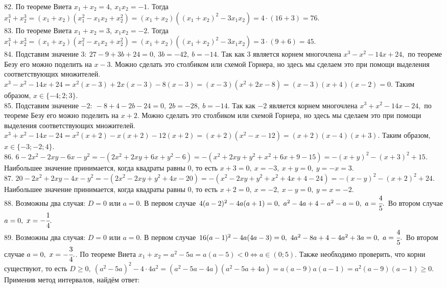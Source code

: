 \documentclass[12pt]{article}
\begin{document}
82. По теореме Виета $x_1+x_2=4,\ x_1x_2=-1.$ Тогда $x_1^3+x_2^3=(x_1+x_2)(x_1^2-x_1x_2+x_2^2)=(x_1+x_2)((x_1+x_2)^2-3x_1x_2)=4\cdot(16+3)=76.$\\
83. По теореме Виета $x_1+x_2=3,\ x_1x_2=-2.$ Тогда $x_1^3+x_2^3=(x_1+x_2)(x_1^2-x_1x_2+x_2^2)=(x_1+x_2)((x_1+x_2)^2-3x_1x_2)=3\cdot(9+6)=45.$\\
84. Подставим значение $3:\ 27-9+3b+24=0,\ 3b=-42,\ b=-14.$ Так как 3 является корнем многочлена $x^3-x^2-14x+24,$ по теореме Безу его можно поделить на $x-3.$ Можно сделать это столбиком или схемой Горнера, но здесь мы сделаем это при помощи выделения соответствующих множителей.
$x^3-x^2-14x+24=x^2(x-3)+2x(x-3)-8(x-3)=(x-3)(x^2+2x-8)=(x-3)(x+4)(x-2)=0.$ Таким образом, $x\in\{-4; 2; 3\}.$\\
85. Подставим значение $-2:\ -8+4-2b-24=0,\ 2b=-28,\ b=-14.$ Так как $-2$ является корнем многочлена $x^3+x^2-14x-24,$ по теореме Безу его можно поделить на $x+2.$ Можно сделать это столбиком или схемой Горнера, но здесь мы сделаем это при помощи выделения соответствующих множителей.
$x^3+x^2-14x-24=x^2(x+2)-x(x+2)-12(x+2)=(x+2)(x^2-x-12)=(x+2)(x-4)(x+3).$ Таким образом, $x\in\{-3; -2; 4\}.$\\
86. $6-2x^2-2xy-6x-y^2=-(2x^2+2xy+6x+y^2-6)=-(x^2+2xy+y^2+x^2+6x+9-15)=-(x+y)^2-(x+3)^2+15.$ Наибольшее значение принимается, когда квадраты равны 0, то есть $x+3=0,\ x=-3,\ x+y=0,\ y=-x=3.$\\
87. $20-2x^2+2xy-4x-y^2=-(2x^2-2xy+y^2+4x-20)=-(x^2-2xy+y^2+x^2+4x+4-24)=-(x-y)^2-(x+2)^2+24.$ Наибольшее значение принимается, когда квадраты равны 0, то есть $x+2=0,\ x=-2,\ x-y=0,\ y=x=-2.$\\
88. Возможны два случая: $D=0$ или $a=0.$ В первом случае $4(a-2)^2-4a(a+1)=0,\ a^2-4a+4-a^2-a=0,\ a=\cfrac{4}{5}.$ Во втором случае $a=0,\ x=-\cfrac{1}{4}.$\\
89. Возможны два случая: $D=0$ или $a=0.$ В первом случае $16(a-1)^2-4a(4a-3)=0,\ 4a^2-8a+4-4a^2+3a=0,\ a=\cfrac{4}{5}.$ Во втором случае $a=0,\ x=-\cfrac{3}{4}.$\newpage{}. По теореме Виета $x_1+x_2=a^2-5a=a(a-5)<0\Leftrightarrow a\in(0;5).$ Также необходимо проверить, что корни существуют, то есть $D\geqslant0,\ (a^2-5a)^2-4\cdot4a^2=(a^2-5a-4a)(a^2-5a+4a)=a(a-9)a(a-1)=a^2(a-9)(a-1)\geqslant0.$ Применив метод интервалов, найдём ответ:
\begin{figure}[ht!]
\end{figure}
\end{document}
